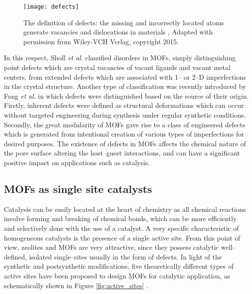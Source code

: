 \begin{figure}[!h] 
 	\centering
	\texttt{[image: defects]}
	\caption[The definition of defects: the missing and incorrectly located atoms
generate vacancies and dislocations in materials.]{The definition of defects:
the missing and incorrectly located atoms generate vacancies and dislocations in
materials \cite{Fang2015}. Adapted with permission from Wiley-VCH Verlag,
copyright 2015.}
	\label{fig:defects}
\end{figure}
\npar
In this respect, Sholl
\textit{et al.}\cite{Sholl2015} classified disorders in MOFs, simply distinguishing point defects which are crystal vacancies of vacant ligands and vacant metal centers,
from extended defects which are associated with 1-- or 2--D imperfections in the
crystal structure. Another type of classification was recently introduced by Fang \textit{et al.}\cite{Fang2015} 
in which defects were distinguished based on the source of their origin. 
Firstly, inherent defects were defined as structural deformations which can occur without targeted engineering during synthesis under regular synthetic conditions. 
Secondly, the great modularity of MOFs gave rise to a class of engineered defects which is generated from intentional 
creation of various types of imperfections for desired purposes.
The existence of defects in MOFs affects the chemical nature of
the pore surface altering the host--guest interactions, and can have a significant positive impact on applications such as catalysis.


\subsection*{MOFs as single site catalysts}
Catalysis can be easily located at the heart of chemistry as all chemical
reactions involve forming and breaking of chemical bonds, which can be
more efficiently and selectively done with the use of a catalyst. A very specific
characteristic of homogeneous catalysts is the presence of a single active
site. From this point of view, zeolites and MOFs are very attractive, since they
possess catalytic well--defined, isolated single--sites usually in the form of
defects. In light of the synthetic and
postsynthetic modifications, five theoretically different types of active sites
have been proposed to design MOFs for catalytic application, as schematically
shown in Figure \ref{fig:active_sites}
\cite{Chughtai2015,Corma2010,Lee2009,Li2016,Liu2014,Rogge2017}.

